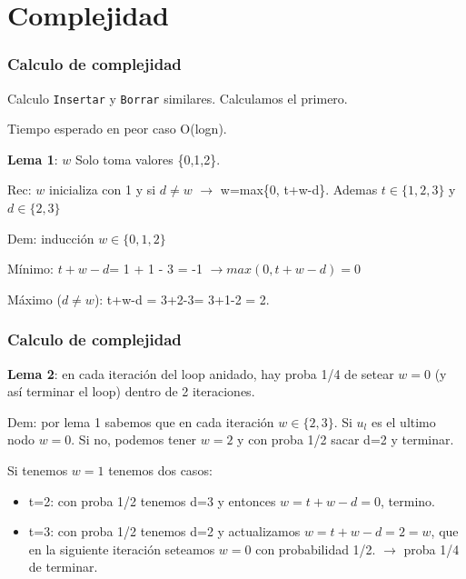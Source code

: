 \documentclass[10pt]{beamer}
\begin{document}
\section{Complejidad}
\begin{frame}
\frametitle{Calculo de complejidad}

Calculo \texttt{Insertar} y \texttt{Borrar} similares.
Calculamos el primero.

Tiempo esperado  en peor caso O(logn).
\vspace{-0.2cm}
\pause


\textbf{Lema 1}: $w$ Solo toma valores \{0,1,2\}.

Rec: $w$ inicializa con 1 y si $d\neq w$ $\to$ w=max\{0, t+w-d\}.
Ademas $t\in\{1,2,3\}$ y $d\in\{2,3\}$

\pause
Dem: inducción $w\in \{0,1,2\}$
\pause

Mínimo: $t+w-d$= 1 + 1 - 3 = -1 $\rightarrow max(0, t+w-d)=0$
\pause

Máximo ($d\neq w$): t+w-d = 3+2-3= 3+1-2 = 2.


\end{frame}
\begin{frame}
\frametitle{Calculo de complejidad}
\textbf{Lema 2}: en cada iteración del loop anidado, hay proba 1/4 de setear $w=0$ (y así terminar el loop) dentro de 2 iteraciones.
\vspace{-0.2cm}
\pause

Dem: por lema 1 sabemos que en cada iteración $w\in\{2,3\}$.
Si $u_l$ es el ultimo nodo $w=0$.
Si no, podemos tener $w=2$ y con proba 1/2 sacar d=2 y terminar.

Si tenemos $w=1$ tenemos dos casos:
\vspace{-0.3cm}
\pause
\begin{itemize}\itemsep-1em
  \item t=2: con proba 1/2 tenemos d=3 y entonces $w=t+w-d=0$, termino.
\pause
  \item t=3: con proba 1/2 tenemos d=2 y actualizamos  $w=t+w-d=2=w$, que en la siguiente
    iteración seteamos $w=0$ con probabilidad 1/2. $\to$ proba 1/4 de terminar.
\end{itemize}


\end{frame}
\end{document}
